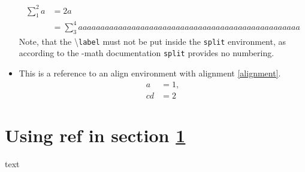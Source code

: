 \documentclass{article}
\def\ifcleveref#1{#1}%
\def\ifcleveref#1{}%
\begin{document}
\begin{itemize}
			\begin{equation}\label{splitLong}
				\begin{split}
					\sum_1^2 a &= 2a\\
							&= \sum_3^4 aaaaaaaaaaaaaaaaaaaaaaaaaaaaaaaaaaaaaaaaaaaaaaaaaa
				\end{split}
			\end{equation}
			Note, that the \textbackslash\texttt{label} must not be put inside the \texttt{split} environment, as according to the \AmS-math documentation \texttt{split} provides no numbering.
		\item This is a reference to an align environment with alignment \ref{alignment}.
			\begin{align}%
				a &= 1,\label{alignment}\\%
				cd &= 2\label{rowTwo}%
			\end{align}%
	\end{itemize}
	\section{Using ref in section \ref{i1}}\label{i1} text
	\ifcleveref{
		\section{Using cref in \texorpdfstring{\cref{i2}}{Section \ref{i2}}}\label{i2} text
		\begin{figure}
			\caption{Ref 2: \cref{i2} and \ref{i2}}
		\end{figure}
	}
\tableofcontents
\listoffigures
\end{document}
